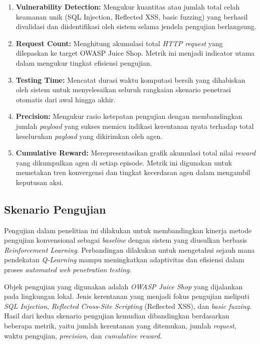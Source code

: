 \begin{enumerate}
    \item \textbf{Vulnerability Detection:} Mengukur kuantitas atau jumlah total celah keamanan unik (SQL Injection, Reflected XSS, basic fuzzing) yang berhasil divalidasi dan diidentifikasi oleh sistem selama jendela pengujian berlangsung.
    \item \textbf{Request Count:} Menghitung akumulasi total \textit{HTTP request} yang dilepaskan ke target OWASP Juice Shop. Metrik ini menjadi indicator utama dalam mengukur tingkat efisiensi pengujian.
    \item \textbf{Testing Time:} Mencatat durasi waktu komputasi bersih yang dihabiskan oleh sistem untuk menyelesaikan seluruh rangkaian skenario penetrasi otomatis dari awal hingga akhir.
    \item \textbf{Precision:} Mengukur rasio ketepatan pengujian dengan membandingkan jumlah \textit{payload} yang sukses memicu indikasi kerentanan nyata terhadap total keseluruhan \textit{payload} yang dikirimkan oleh agen.
    \item \textbf{Cumulative Reward:} Merepresentasikan grafik akumulasi total nilai \textit{reward} yang dikumpulkan agen di setiap episode. Metrik ini digunakan untuk memetakan tren konvergensi dan tingkat kecerdasan agen dalam mengambil keputusan aksi.
\end{enumerate}

\subsection{Skenario Pengujian}

Pengujian dalam penelitian ini dilakukan untuk membandingkan kinerja metode pengujian konvensional sebagai \textit{baseline} dengan sistem yang diusulkan berbasis \textit{Reinforcement Learning}. Perbandingan dilakukan untuk mengetahui sejauh mana pendekatan \textit{Q-Learning} mampu meningkatkan adaptivitas dan efisiensi dalam proses \textit{automated web penetration testing}.

Objek pengujian yang digunakan adalah \textit{OWASP Juice Shop} yang dijalankan pada lingkungan lokal. Jenis kerentanan yang menjadi fokus pengujian meliputi \textit{SQL Injection}, \textit{Reflected Cross-Site Scripting} (Reflected XSS), dan \textit{basic fuzzing}. Hasil dari kedua skenario pengujian kemudian dibandingkan berdasarkan beberapa metrik, yaitu jumlah kerentanan yang ditemukan, jumlah \textit{request}, waktu pengujian, \textit{precision}, dan \textit{cumulative reward}.

